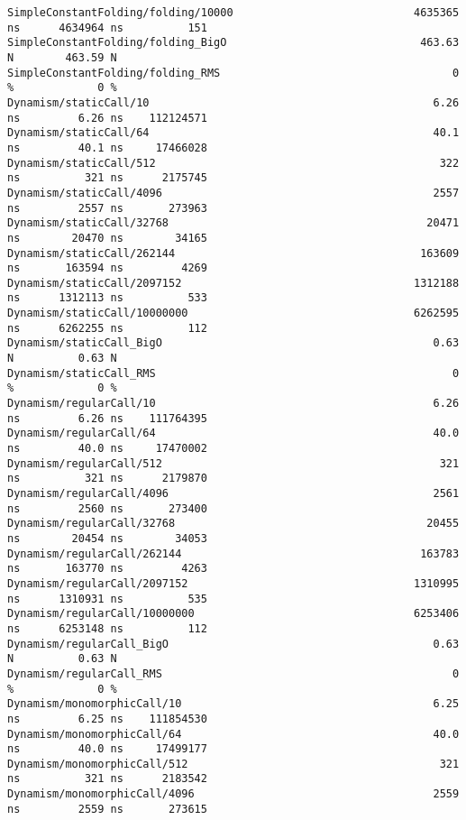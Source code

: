 \begin{code}
\begin{verbatim}
SimpleConstantFolding/folding/10000                            4635365 ns      4634964 ns          151
SimpleConstantFolding/folding_BigO                              463.63 N        463.59 N
SimpleConstantFolding/folding_RMS                                    0 %             0 %
Dynamism/staticCall/10                                            6.26 ns         6.26 ns    112124571
Dynamism/staticCall/64                                            40.1 ns         40.1 ns     17466028
Dynamism/staticCall/512                                            322 ns          321 ns      2175745
Dynamism/staticCall/4096                                          2557 ns         2557 ns       273963
Dynamism/staticCall/32768                                        20471 ns        20470 ns        34165
Dynamism/staticCall/262144                                      163609 ns       163594 ns         4269
Dynamism/staticCall/2097152                                    1312188 ns      1312113 ns          533
Dynamism/staticCall/10000000                                   6262595 ns      6262255 ns          112
Dynamism/staticCall_BigO                                          0.63 N          0.63 N
Dynamism/staticCall_RMS                                              0 %             0 %
Dynamism/regularCall/10                                           6.26 ns         6.26 ns    111764395
Dynamism/regularCall/64                                           40.0 ns         40.0 ns     17470002
Dynamism/regularCall/512                                           321 ns          321 ns      2179870
Dynamism/regularCall/4096                                         2561 ns         2560 ns       273400
Dynamism/regularCall/32768                                       20455 ns        20454 ns        34053
Dynamism/regularCall/262144                                     163783 ns       163770 ns         4263
Dynamism/regularCall/2097152                                   1310995 ns      1310931 ns          535
Dynamism/regularCall/10000000                                  6253406 ns      6253148 ns          112
Dynamism/regularCall_BigO                                         0.63 N          0.63 N
Dynamism/regularCall_RMS                                             0 %             0 %
Dynamism/monomorphicCall/10                                       6.25 ns         6.25 ns    111854530
Dynamism/monomorphicCall/64                                       40.0 ns         40.0 ns     17499177
Dynamism/monomorphicCall/512                                       321 ns          321 ns      2183542
Dynamism/monomorphicCall/4096                                     2559 ns         2559 ns       273615

\end{verbatim}
\end{code}

